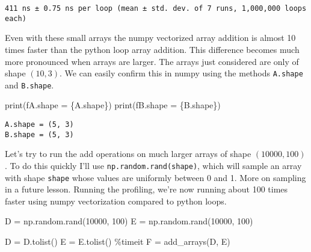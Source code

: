 \documentclass[
  letterpaper,
  DIV=11,
  numbers=noendperiod]{scrreprt}
\newenvironment{Shaded}{\begin{snugshade}}{\end{snugshade}}
\newcommand{\BuiltInTok}[1]{\textcolor[rgb]{0.00,0.23,0.31}{#1}}
\newcommand{\DecValTok}[1]{\textcolor[rgb]{0.68,0.00,0.00}{#1}}
\newcommand{\NormalTok}[1]{\textcolor[rgb]{0.00,0.23,0.31}{#1}}
\newcommand{\OperatorTok}[1]{\textcolor[rgb]{0.37,0.37,0.37}{#1}}
\newcommand{\SpecialCharTok}[1]{\textcolor[rgb]{0.37,0.37,0.37}{#1}}
\newcommand{\SpecialStringTok}[1]{\textcolor[rgb]{0.13,0.47,0.30}{#1}}
\begin{document}
\begin{verbatim}
411 ns ± 0.75 ns per loop (mean ± std. dev. of 7 runs, 1,000,000 loops each)
\end{verbatim}

Even with these small arrays the numpy vectorized array addition is
almost 10 times faster than the python loop array addition. This
difference becomes much more pronounced when arrays are larger. The
arrays just considered are only of shape \((10,3)\). We can easily
confirm this in numpy using the methods \texttt{A.shape} and
\texttt{B.shape}.

\begin{Shaded}
\begin{Highlighting}[]
\BuiltInTok{print}\NormalTok{(}\SpecialStringTok{f\textquotesingle{}A.shape = }\SpecialCharTok{\{}\NormalTok{A}\SpecialCharTok{.}\NormalTok{shape}\SpecialCharTok{\}}\SpecialStringTok{\textquotesingle{}}\NormalTok{)}
\BuiltInTok{print}\NormalTok{(}\SpecialStringTok{f\textquotesingle{}B.shape = }\SpecialCharTok{\{}\NormalTok{B}\SpecialCharTok{.}\NormalTok{shape}\SpecialCharTok{\}}\SpecialStringTok{\textquotesingle{}}\NormalTok{)}
\end{Highlighting}
\end{Shaded}

\begin{verbatim}
A.shape = (5, 3)
B.shape = (5, 3)
\end{verbatim}

Let's try to run the add operations on much larger arrays of shape
\((10000,100)\). To do this quickly I'll use
\texttt{np.random.rand(shape)}, which will sample an array with shape
\texttt{shape} whose values are uniformly between 0 and 1. More on
sampling in a future lesson. Running the profiling, we're now running
about 100 times faster using numpy vectorization compared to python
loops.

\begin{Shaded}
\begin{Highlighting}[]
\NormalTok{D }\OperatorTok{=}\NormalTok{ np.random.rand(}\DecValTok{10000}\NormalTok{, }\DecValTok{100}\NormalTok{)}
\NormalTok{E }\OperatorTok{=}\NormalTok{ np.random.rand(}\DecValTok{10000}\NormalTok{, }\DecValTok{100}\NormalTok{)}
\end{Highlighting}
\end{Shaded}

\begin{Shaded}
\begin{Highlighting}[]
\NormalTok{D }\OperatorTok{=}\NormalTok{ D.tolist()}
\NormalTok{E }\OperatorTok{=}\NormalTok{ E.tolist()}
\OperatorTok{\%}\NormalTok{timeit F }\OperatorTok{=}\NormalTok{ add\_arrays(D, E)}
\end{Highlighting}
\end{Shaded}
\end{document}
